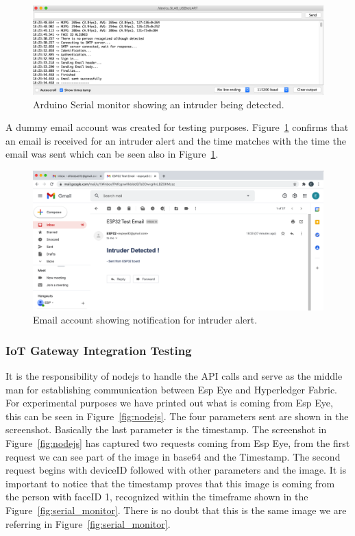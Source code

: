 \begin{figure}[!htb]
    \centering
    \includegraphics[width=1\textwidth]{figures/serialportemail.png}
    \caption{Arduino Serial monitor showing an intruder being detected.}
    \label{fig:serial_email}
\end{figure}

 A dummy email account was created for testing purposes. Figure~\ref{fig:serial_email} confirms that an email is received for an intruder alert and the time matches with the time the email was sent which can be seen also in Figure~\ref{fig:serial_email}.
\begin{figure}[!htb]
    \centering
    \includegraphics[width=1\textwidth]{figures/email.png}
    \caption{Email account showing notification for intruder alert.}
    \label{fig:email_intruder}
\end{figure}


\subsubsection{IoT Gateway Integration Testing}

It is the responsibility of nodejs to handle the API calls and serve as the middle man for establishing communication between Esp Eye and Hyperledger Fabric. For experimental purposes we have printed out what is coming from Esp Eye, this can be seen in Figure~\ref{fig:nodejs}. The four parameters sent are shown in the screenshot. Basically the last parameter is the timestamp. The screenshot in Figure~\ref{fig:nodejs} has captured two requests coming from Esp Eye, from the first request we can see part of the image in base64 and the Timestamp. The second request begins with deviceID followed with other parameters and the image. It is important to notice that the timestamp proves that this image is coming from the person with faceID 1, recognized within the timeframe shown in the Figure~\ref{fig:serial_monitor}. There is no doubt that this is the same image we are referring in Figure~\ref{fig:serial_monitor}.

